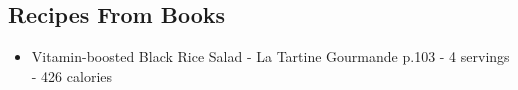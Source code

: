 \subsection*{Recipes From Books}
\begin{itemize}
    \item Vitamin-boosted Black Rice Salad - La Tartine Gourmande p.103 - 4 servings - 426 calories
\end{itemize}